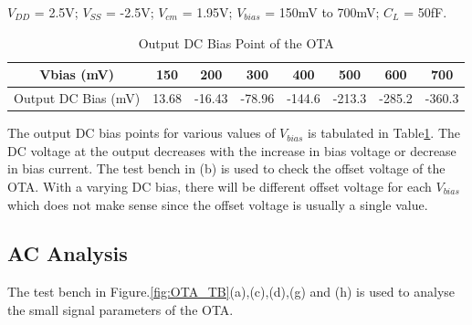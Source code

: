 $V_{DD}$ = 2.5V; $V_{SS}$ = -2.5V; $V_{cm}$ = 1.95V; $V_{bias}$ = 150mV to 700mV;   $C_{L}$ = 50fF.

\begin{table} [H]
\centering
\begin{tabular}{@{}cccccccc@{}}
\toprule
Vbias (mV)					& 150		& 200			& 300			& 400			& 500			& 600			& 700 \\ \midrule
Output DC Bias (mV)			& 13.68		& -16.43		& -78.96		& -144.6		& -213.3		& -285.2		& -360.3 \\
\bottomrule
\end{tabular}
\caption{Output DC Bias Point of the OTA}
\label{tab:OTA_DC_Bias}
\end{table}

The output DC bias points for various values of $V_{bias}$ is tabulated in Table\ref{tab:OTA_DC_Bias}. The DC voltage at the output decreases with the increase in bias voltage or decrease in bias current. The test bench in (b) is used to check the offset voltage of the OTA. With a varying DC bias, there will be different offset voltage for each $V_{bias}$ which does not make sense since the offset voltage is usually a single value.

\subsection{AC Analysis}
The test bench in Figure.\ref{fig:OTA_TB}(a),(c),(d),(g) and (h) is used to analyse the small signal parameters of the OTA.

